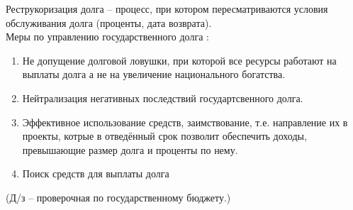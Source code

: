\documentclass[12pt,a4paper]{book}
\begin{document}
Реструкоризация долга -- процесс, при котором пересматриваются условия обслуживания долга (проценты, дата возврата).\\
Меры по управлению государственного долга :
\begin{enumerate}
	\item Не допущение долговой ловушки, при которой все ресурсы работают на выплаты долга а не на увеличение национального богатства.
	\item Нейтрализация негативных последствий государтсвенного долга.
	\item Эффективное использование средств, заимствование, т.е. направление их в проекты, котрые в отведённый срок позволит обеспечить доходы, превышающие размер долга и проценты по нему.
	\item Поиск средств для выплаты долга
\end{enumerate}

{\Huge (Д/з -- проверочная по государственному бюджету.)}
\end{document}
